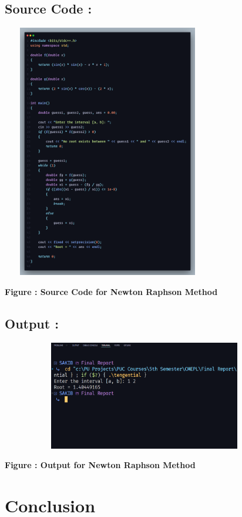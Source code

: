 \documentclass{scrreprt}
\begin{document}
\subsection*{Source Code : }
\begin{center}
    {\includegraphics[width=350px, height=420px]{newton_code.png}}
    \parbox{0.8\textwidth}{ 
        \centering
        \textbf{Figure : Source Code for Newton Raphson Method}
    }
\end{center}
\subsection*{Output : }
\begin{center}
    {\includegraphics[width=475px, height=180px]{newton_output.png}}
    \parbox{0.8\textwidth}{ 
        \centering
        \textbf{Figure : Output for Newton Raphson Method}
    }
\end{center}

\section*{Conclusion}
\end{document}
